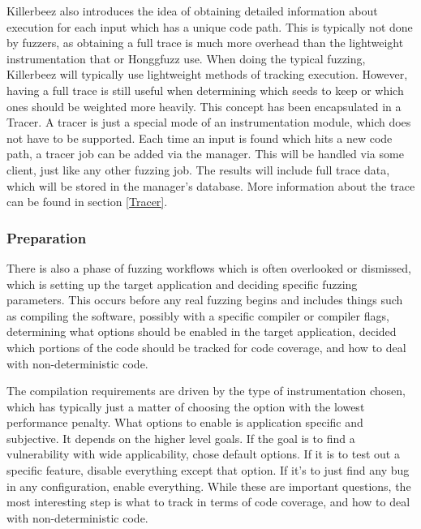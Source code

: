 \begin{multicols}{2}

Killerbeez also introduces the idea of obtaining detailed information about
execution for each input which has a unique code path.  This is typically
not done by fuzzers, as obtaining a full trace is much more overhead than
the lightweight instrumentation that \AFL{} or Honggfuzz use. When doing the
typical fuzzing, Killerbeez will typically use lightweight methods of tracking
execution. However, having a full trace is still useful when determining which
seeds to keep or which ones should be weighted more heavily. This concept has
been encapsulated in a Tracer. A tracer is just a special mode of an
instrumentation module, which does not have to be supported. Each time an input
is found which hits a new code path, a tracer job can be added via the manager.
This will be handled via some \BOINC{} client, just like any other fuzzing job.
The results will include full trace data, which will be stored in the manager's
database.  More information about the trace can be found in section
\ref{Tracer}.

\subsubsection{Preparation}  \label{Preparation Overview}
There is also a phase of fuzzing workflows which is often overlooked or
dismissed, which is setting up the target application and deciding specific
fuzzing parameters. This occurs before any real fuzzing begins and includes
things such as compiling the software, possibly with a specific compiler or
compiler flags, determining what options should be enabled in the target
application, decided which portions of the code should be tracked for code
coverage, and how to deal with non-deterministic code.

The compilation requirements are driven by the type of instrumentation chosen,
which has typically just a matter of choosing the option with the lowest
performance penalty. What options to enable is application specific and
subjective.  It depends on the higher level goals.  If the goal is to find a
vulnerability with wide applicability, chose default options. If it is to test
out a specific feature, disable everything except that option. If it's to just
find any bug in any configuration, enable everything.  While these are
important questions, the most interesting step is what to track in terms of
code coverage, and how to deal with non-deterministic code.


\end{multicols}
